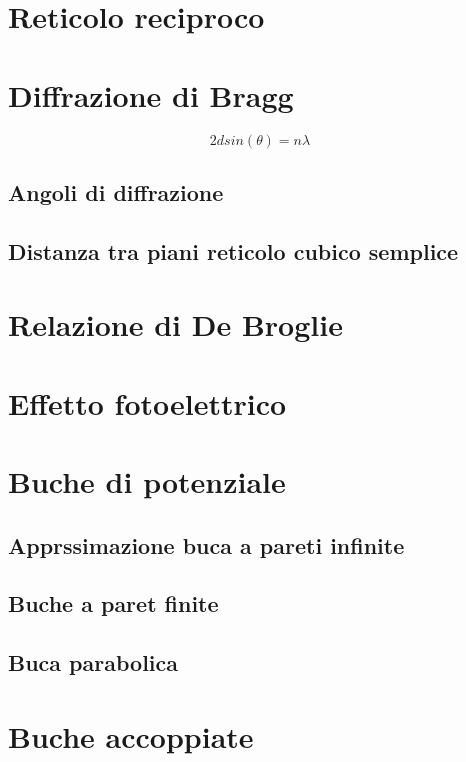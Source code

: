 \documentclass[10pt,a4paper]{report}
\begin{document}
\chapter{Reticolo reciproco}

\chapter{Diffrazione di Bragg}

\[
2dsin(\theta)=n\lambda
\]

	\section{Angoli di diffrazione}

	\section{Distanza tra piani reticolo cubico semplice}

\chapter{Relazione di De Broglie}

\chapter{Effetto fotoelettrico}

\chapter{Buche di potenziale}

	\section{Apprssimazione buca a pareti infinite}

	\section{Buche a paret finite}

	\section{Buca parabolica}


\chapter{Buche accoppiate}
\end{document}
